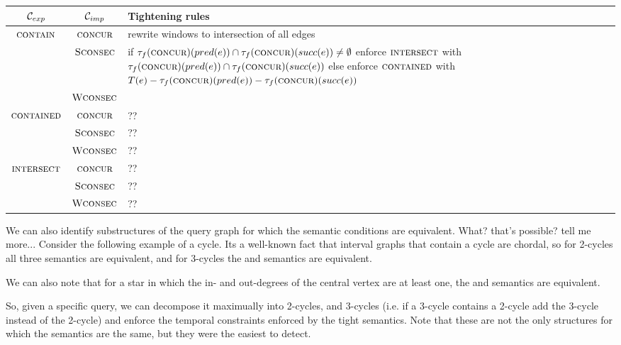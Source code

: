 \begin{center}
  \begin{tabular}{cc L{7cm}} \toprule
    $\mathcal{C}_{exp}$      & $\mathcal{C}_{imp}$        & Tightening rules \\ \midrule
    $\textsc{contain}$    & $\textsc{concur}$       & rewrite windows to intersection of all edges\\
                  & $\textsc{Sconsec}$ & 

    if $\tau_f(\textsc{concur})(pred(e)) \cap \tau_f(\textsc{concur})(succ(e)) \neq
    \emptyset$ enforce $\textsc{intersect}$ with $\tau_f(\textsc{concur})(pred(e)) \cap
    \tau_f(\textsc{concur})(succ(e))$ else enforce $\textsc{contained}$ with $T(e) -
    \tau_f(\textsc{concur})(pred(e)) - \tau_f(\textsc{concur})(succ(e))$

    \\
                  & $\textsc{Wconsec}$   &  \\
    $\textsc{contained}$  & $\textsc{concur}$       & ?? \\
                  & $\textsc{Sconsec}$ & ?? \\
                  & $\textsc{Wconsec}$   & ??\\
    $\textsc{intersect}$  & $\textsc{concur}$       & ?? \\
                  & $\textsc{Sconsec}$ & ?? \\
                  & $\textsc{Wconsec}$   & ?? \\
    
    \bottomrule
  \end{tabular}
\end{center}

We can also identify substructures of the query graph for which the semantic
conditions are equivalent. What? that's possible? tell me more... Consider the
following example of a cycle. Its a well-known fact that interval graphs that
contain a cycle are chordal, so for 2-cycles all three semantics are equivalent,
and for 3-cycles the \concurrent{} and \strongConsec{} semantics are
equivalent.

We can also note that for a star in which the in- and out-degrees of the central
vertex are at least one, the \concurrent{} and \strongConsec{} semantics
are equivalent.

So, given a specific query, we can decompose it maximually into 2-cycles, and
3-cycles (i.e. if a 3-cycle contains a 2-cycle add the 3-cycle instead of the
2-cycle) and enforce the temporal constraints enforced by the tight
semantics. Note that these are not the only structures for which the semantics
are the same, but they were the easiest to detect.

